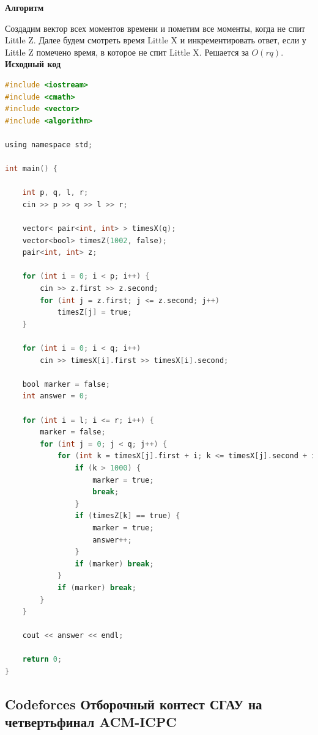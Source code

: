 \documentclass[a4paper,12pt]{article}
\begin{document}
\textbf{{\large Алгоритм}}

Создадим вектор всех моментов времени и пометим все моменты, когда не спит Little Z. Далее будем смотреть время Little X и инкрементировать ответ, если у Little Z помечено время, в которое не спит Little X. Решается за $O(rq)$.\\

\textbf{{\large Исходный код}} \\
\begin{lstlisting}[language=C]
#include <iostream>
#include <cmath>
#include <vector>
#include <algorithm>

using namespace std;

int main() {

    int p, q, l, r;
    cin >> p >> q >> l >> r;

    vector< pair<int, int> > timesX(q);
    vector<bool> timesZ(1002, false);
    pair<int, int> z;

    for (int i = 0; i < p; i++) {
        cin >> z.first >> z.second;
        for (int j = z.first; j <= z.second; j++)
            timesZ[j] = true;
    }

    for (int i = 0; i < q; i++)
        cin >> timesX[i].first >> timesX[i].second;

    bool marker = false;
    int answer = 0;

    for (int i = l; i <= r; i++) {
        marker = false;
        for (int j = 0; j < q; j++) {
            for (int k = timesX[j].first + i; k <= timesX[j].second + i; k++) {
                if (k > 1000) {
                    marker = true;
                    break;
                }
                if (timesZ[k] == true) {
                    marker = true;
                    answer++;
                }
                if (marker) break;
            }
            if (marker) break;
        }
    }

    cout << answer << endl;

    return 0;
}
\end{lstlisting}



%
%

\newpage
\subsection{Codeforces Отборочный контест СГАУ на четвертьфинал ACM-ICPC}
\end{document}
